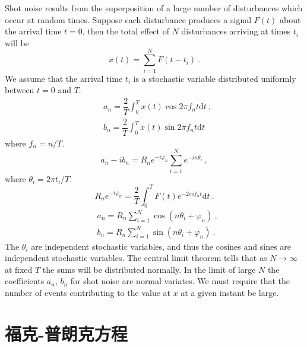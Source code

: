 \documentclass[11pt,a4paper]{article}
\newcommand{\dif}{\mathrm{d}}
\newcounter{theo}[section]\setcounter{theo}{0}
\begin{document}
\cite{kittel1958elementary} Shot noise results from the superposition of a large number of disturbances which occur at random times. Suppose each disturbance produces a signal $F(t)$ about the arrival time $t=0$, then the total effect of $N$ disturbances arriving at times $t_i$ will be
\begin{equation}
x(t) = \sum_{i=1}^N F(t-t_i) ~.
\end{equation}
We assume that the arrival time $t_i$ is a stochastic variable distributed uniformly between $t=0$ and $T$. 
\begin{align}
& a_n = \dfrac{2}{T} \int_0^T x(t) \cos 2\pi f_n t \dif t ~, \\
& b_n = \dfrac{2}{T} \int_0^T x(t) \sin 2\pi f_n t \dif t
\end{align}
where $f_n = n /T$. 
\begin{equation*}
a_n -i b_n = R_n e^{-i\varphi_n} \sum_{i=1}^N e^{-in\theta_i} ~,
\end{equation*}
where $\theta_i = 2\pi t_i/T$.
\begin{equation}
R_n e^{-i\varphi_n} = \dfrac{2}{T} \int_0^T F(t) e^{-2\pi i f_n t} \dif t ~.
\end{equation}
\begin{align}
& a_n = R_n \sum_{i=1}^N \cos (n\theta_i +\varphi_n) ~, \\
& b_n = R_n \sum_{i=1}^N \sin (n\theta_i +\varphi_n) ~.
\end{align}
The $\theta_i$ are independent stochastic variables, and thus the cosines and sines are independent  stochastic variables. The central limit theorem tells that as $N \rightarrow \infty$ at fixed $T$ the sums will be distributed normally. In the limit of large $N$ the coefficients $a_n$, $b_n$ for shot noise are normal variates. We must require that the number of events contributing to the value at $x$ at a given instant be large.


\section{福克-普朗克方程}
\cite{wangzhuxi1965} 
\end{document}
